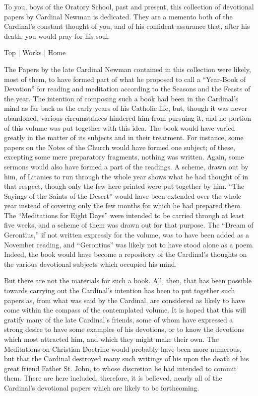 



To you, boys of the Oratory School,
past and present, this collection of devotional papers by Cardinal
Newman is dedicated. They are a memento both of the Cardinal's
constant thought of you, and of his confident assurance that, after
his death, you would pray for his soul.


Top | Works | Home










The Papers by
the late Cardinal Newman contained in this collection were likely, most
of them, to have formed part of what he proposed to call a ``Year-Book
of Devotion'' for reading and meditation according to the Seasons and
the Feasts of the year. The intention of composing such a book had been
in the Cardinal's mind as far back as the early years of his Catholic
life, but, though it was never abandoned, various circumstances hindered
him from pursuing it, and no portion of this volume was put together
with this idea. The book would have varied greatly in the matter of its
subjects and in their treatment. For instance, some papers on the Notes
of the Church would have formed one subject; of these, excepting some
mere preparatory fragments, nothing was written. Again, some sermons
would also have formed a part of the readings. A scheme, drawn out by
him, of Litanies to run through the whole year shows what he had thought
of in that respect, though only the few here printed were put together
by him. ``The Sayings of the Saints of the Desert'' would have been
extended over the whole year instead of covering only the few months for
which he had prepared them. The ``Meditations for Eight Days'' were
intended to be carried through at least five weeks, and a scheme
of them was drawn out for that purpose. The ``Dream of Gerontius,'' if
not written expressly for the volume, was to have been added as a
November reading, and ``Gerontius'' was likely not to have stood alone
as a poem. Indeed, the book would have become a repository of the
Cardinal's thoughts on the various devotional subjects which occupied
his mind.


But there are not
the materials for such a book. All, then, that has been possible towards
carrying out the Cardinal's intention has been to put together such
papers as, from what was said by the Cardinal, are considered as likely
to have come within the compass of the contemplated volume. It is hoped
that this will gratify many of the late Cardinal's friends, some of
whom have expressed a strong desire to have some examples of his
devotions, or to know the devotions which most attracted him, and which
they might make their own. The Meditations on Christian Doctrine would
probably have been more numerous, but that the Cardinal destroyed many
such writings of his upon the death of his great friend Father St. John,
to whose discretion he had intended to commit them. There are here
included, therefore, it is believed, nearly all of the Cardinal's
devotional papers which are likely to be forthcoming.


